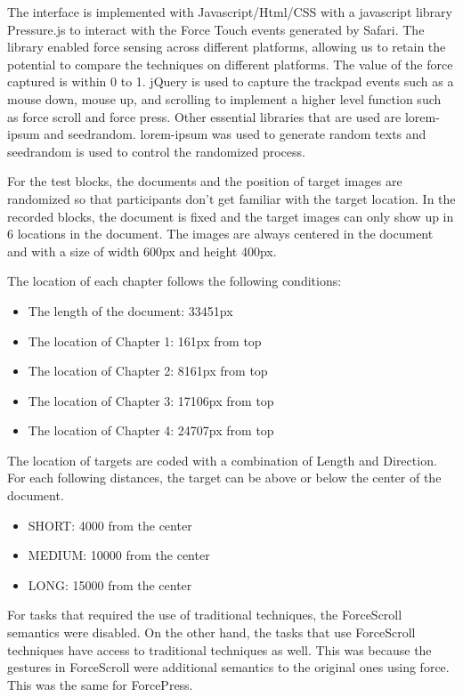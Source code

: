 \documentclass{sigchi}
\begin{document}
The interface is implemented with Javascript/Html/CSS with a javascript library Pressure.js\cite{pressurejs} to interact with the Force Touch events generated by Safari. The library enabled force sensing across different platforms, allowing us to retain the potential to compare the techniques on different platforms. The value of the force captured is within 0 to 1. jQuery is used to capture the trackpad events such as a mouse down, mouse up, and scrolling to implement a higher level function such as force scroll and force press. Other essential libraries that are used are lorem-ipsum and seedrandom. lorem-ipsum was used to generate random texts and seedrandom is used to control the randomized process.

For the test blocks, the documents and the position of target images are randomized so that participants don’t get familiar with the target location. In the recorded blocks, the document is fixed and the target images can only show up in 6 locations in the document. The images are always centered in the document and with a size of width 600px and height 400px.

The location of each chapter follows the following conditions:
\begin{itemize}
\item The length of the document: 33451px
\item The location of Chapter 1: 161px from top
\item The location of Chapter 2: 8161px from top
\item The location of Chapter 3: 17106px from top
\item The location of Chapter 4: 24707px from top
\end{itemize}

The location of targets are coded with a combination of Length and Direction. For each following distances, the target can be above or below the center of the document.

\begin{itemize}
    \item SHORT: 4000 from the center
    \item MEDIUM: 10000 from the center
    \item LONG: 15000 from the center
\end{itemize}

For tasks that required the use of traditional techniques, the ForceScroll semantics were disabled. On the other hand, the tasks that use ForceScroll techniques have access to traditional techniques as well. This was because the gestures in ForceScroll were additional semantics to the original ones using force. This was the same for ForcePress.
\end{document}
